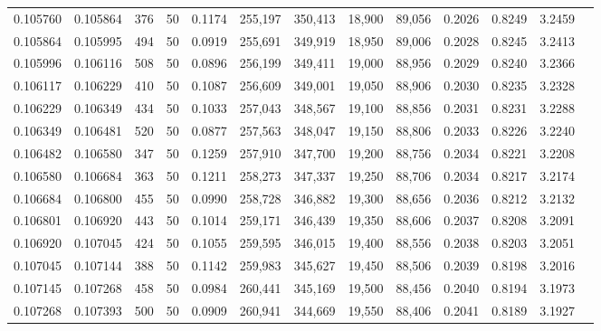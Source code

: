 \begin{tabular}{rrrrrrrrrrrrr}
0.105760 & 0.105864 &   376 &  50 &                                     0.1174 & 255,197 & 350,413 &  18,900 &  89,056 & 0.2026 & 0.8249 & 3.2459 \\
0.105864 & 0.105995 &   494 &  50 &                                     0.0919 & 255,691 & 349,919 &  18,950 &  89,006 & 0.2028 & 0.8245 & 3.2413 \\
0.105996 & 0.106116 &   508 &  50 &                                     0.0896 & 256,199 & 349,411 &  19,000 &  88,956 & 0.2029 & 0.8240 & 3.2366 \\
0.106117 & 0.106229 &   410 &  50 &                                     0.1087 & 256,609 & 349,001 &  19,050 &  88,906 & 0.2030 & 0.8235 & 3.2328 \\
0.106229 & 0.106349 &   434 &  50 &                                     0.1033 & 257,043 & 348,567 &  19,100 &  88,856 & 0.2031 & 0.8231 & 3.2288 \\
0.106349 & 0.106481 &   520 &  50 &                                     0.0877 & 257,563 & 348,047 &  19,150 &  88,806 & 0.2033 & 0.8226 & 3.2240 \\
0.106482 & 0.106580 &   347 &  50 &                                     0.1259 & 257,910 & 347,700 &  19,200 &  88,756 & 0.2034 & 0.8221 & 3.2208 \\
0.106580 & 0.106684 &   363 &  50 &                                     0.1211 & 258,273 & 347,337 &  19,250 &  88,706 & 0.2034 & 0.8217 & 3.2174 \\
0.106684 & 0.106800 &   455 &  50 &                                     0.0990 & 258,728 & 346,882 &  19,300 &  88,656 & 0.2036 & 0.8212 & 3.2132 \\
0.106801 & 0.106920 &   443 &  50 &                                     0.1014 & 259,171 & 346,439 &  19,350 &  88,606 & 0.2037 & 0.8208 & 3.2091 \\
0.106920 & 0.107045 &   424 &  50 &                                     0.1055 & 259,595 & 346,015 &  19,400 &  88,556 & 0.2038 & 0.8203 & 3.2051 \\
0.107045 & 0.107144 &   388 &  50 &                                     0.1142 & 259,983 & 345,627 &  19,450 &  88,506 & 0.2039 & 0.8198 & 3.2016 \\
0.107145 & 0.107268 &   458 &  50 &                                     0.0984 & 260,441 & 345,169 &  19,500 &  88,456 & 0.2040 & 0.8194 & 3.1973 \\
0.107268 & 0.107393 &   500 &  50 &                                     0.0909 & 260,941 & 344,669 &  19,550 &  88,406 & 0.2041 & 0.8189 & 3.1927 \\

\end{tabular}
